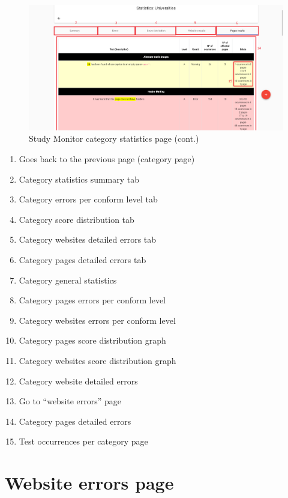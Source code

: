 \begin{figure}[H]
    \centering
    \includegraphics[width=\linewidth]{lib/images/study/study_category_statistics_5.png}
    \caption{Study Monitor category statistics page (cont.)}
    \label{fig:study_category_statistics_page_5}
\end{figure}

\begin{enumerate}
    \item Goes back to the previous page (category page)
    \item Category statistics summary tab
    \item Category errors per conform level tab
    \item Category score distribution tab
    \item Category websites detailed errors tab
    \item Category pages detailed errors tab
    \item Category general statistics
    \item Category pages errors per conform level
    \item Category websites errors per conform level
    \item Category pages score distribution graph
    \item Category websites score distribution graph
    \item Category website detailed errors
    \item Go to ``website errors'' page
    \item Category pages detailed errors
    \item Test occurrences per category page
\end{enumerate}

\section{Website errors page}

